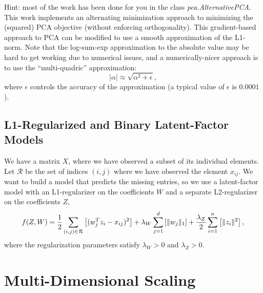 \documentclass{article}
\begin{document}
Hint: most of the work has been done for you in the class \emph{pca.AlternativePCA}. This work implements an alternating minimization approach to minimizing the (squared) PCA objective (without enforcing orthogonality). This gradient-based approach to PCA can be modified to use a smooth approximation of the L1-norm. Note that the log-sum-exp approximation to the absolute value may be hard to get working due to numerical issues, and a numerically-nicer approach is to use the ``multi-quadric'' approximation:
\[
|\alpha| \approx \sqrt{\alpha^2 + \epsilon},
\]
where $\epsilon$ controls the accuracy of the approximation (a typical value of $\epsilon$ is $0.0001$).


\subsection{L1-Regularized and Binary Latent-Factor Models}

We have a matrix $X$, where we have observed a subset of its individual elements. Let $\mathcal{R}$ be the set of indices $(i,j)$ where we have observed the element $x_{ij}$. We want to build a model that predicts the missing entries, so we use a latent-factor model with an L1-regularizer on the coefficients $W$ and a separate L2-regularizer on the coefficients $Z$,
\[
f(Z,W) = \frac{1}{2}\sum_{(i,j) \in \mathcal{R}}\left[(w_j^Tz_i - x_{ij})^2 \right] + \lambda_W \sum_{j=1}^d \left[\|w_j\|_1\right] + \frac{\lambda_Z}{2} \sum_{i=1}^n \left[\|z_i\|^2\right],
\]
where the regularization parameters satisfy $\lambda_W > 0$ and $\lambda_Z > 0$.



\section{Multi-Dimensional Scaling}
\end{document}
